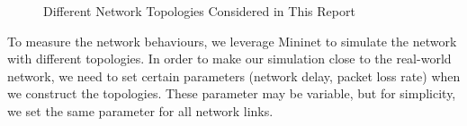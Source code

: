 \begin{figure}[ht]


\caption{Different Network Topologies Considered in This Report} 
\label{fig:topo}
\end{figure}

To measure the network behaviours, we leverage Mininet \cite{Mininet:official}
to simulate the network with different topologies. In order to make our simulation
close to the real-world network, we need to set certain parameters (\eg network 
delay, packet loss rate) when we construct the topologies. These parameter may be
variable, but for simplicity, we set the same parameter for all network links. 

